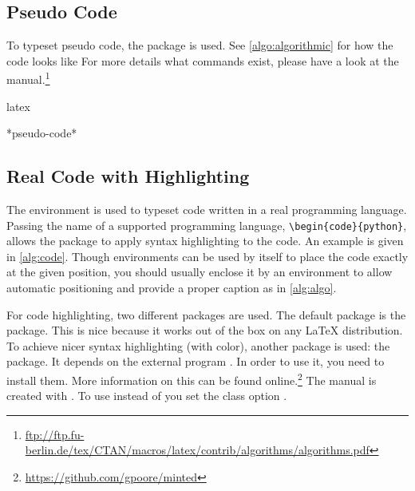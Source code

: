 \subsection{Pseudo Code}
To typeset pseudo code, the  package is used. See
\autoref{algo:algorithmic} for how the code looks like
For more details what commands exist, please have a look at the
manual.\footnote{\url{ftp://ftp.fu-berlin.de/tex/CTAN/macros/latex/contrib/algorithms/algorithms.pdf}}

\begin{algorithm}
    \caption{%
        The  environment can be used to typeset
        pseudo-code.
    }%
    \label{algo:algorithmic}
    \begin{code}{latex}
\begin{algorithmic}
    *pseudo-code*
\end{algorithmic}
    \end{code}
\end{algorithm}

\subsection{Real Code with Highlighting}%
\label{sub:codehigh}

The  environment is used to typeset code written in a real
programming language. Passing the name of a supported programming language,
\eg \verb!\begin{code}{python}!, allows the package to apply syntax
highlighting to the code. An example is given in \autoref{alg:code}.  Though
 environments can be used by itself to place the code exactly at the
given position, you should usually enclose it by an 
environment to allow automatic positioning and provide a proper caption as in
\autoref{alg:algo}.

For code highlighting, two different packages are used. The default package is
the  package. This is nice because it works out of the box on
any \LaTeX{} distribution. To achieve nicer syntax highlighting (with color),
another package is used: the  package. It depends on the external
 program . In order to use it, you need to install
them. More information on this can be found
online.\footnote{\url{https://github.com/gpoore/minted}} The manual is created
with .  To use  instead of  you set the
class option .

